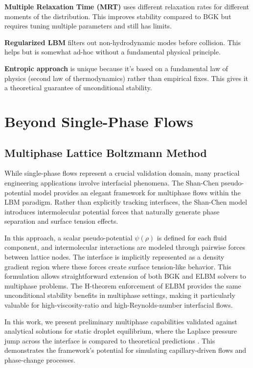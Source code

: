 \textbf{Multiple Relaxation Time (MRT)} \citep{dhumieres1992} uses different relaxation rates for different moments of the distribution. This improves stability compared to BGK but requires tuning multiple parameters and still has limits.

\textbf{Regularized LBM} \citep{latt2006} filters out non-hydrodynamic modes before collision. This helps but is somewhat ad-hoc without a fundamental physical principle.

\textbf{Entropic approach} is unique because it's based on a fundamental law of physics (second law of thermodynamics) rather than empirical fixes. This gives it a theoretical guarantee of unconditional stability.

\section{Beyond Single-Phase Flows}

\subsection{Multiphase Lattice Boltzmann Method}

While single-phase flows represent a crucial validation domain, many practical engineering applications involve interfacial phenomena. The Shan-Chen pseudo-potential model \citep{shan1993,shan1994} provides an elegant framework for multiphase flows within the LBM paradigm. Rather than explicitly tracking interfaces, the Shan-Chen model introduces intermolecular potential forces that naturally generate phase separation and surface tension effects.

In this approach, a scalar pseudo-potential $\psi(\rho)$ is defined for each fluid component, and intermolecular interactions are modeled through pairwise forces between lattice nodes. The interface is implicitly represented as a density gradient region where these forces create surface tension-like behavior. This formulation allows straightforward extension of both BGK and ELBM solvers to multiphase problems. The H-theorem enforcement of ELBM provides the same unconditional stability benefits in multiphase settings, making it particularly valuable for high-viscosity-ratio and high-Reynolds-number interfacial flows.

In this work, we present preliminary multiphase capabilities validated against analytical solutions for static droplet equilibrium, where the Laplace pressure jump across the interface is compared to theoretical predictions \citep{laplace1806}. This demonstrates the framework's potential for simulating capillary-driven flows and phase-change processes.

